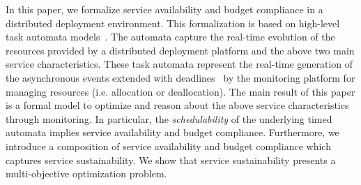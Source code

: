 In this paper, we formalize service availability and budget compliance in a distributed deployment environment.
This formalization is based on  
high-level task automata models~\cite{alur:1994:timedautomata,fersman2007task,jaghoori2010time}.
The automata capture the real-time evolution of the resources provided by a distributed deployment platform and 
the above two main service characteristics.
These  task  automata represent the  real-time generation of the asynchronous events 
extended with deadlines~\cite{bjork2013:rtabs,nobakht2013future}
by the monitoring platform for managing resources (i.e. allocation or  deallocation).
The main result of this paper is a formal model to optimize and reason about the above service  characteristics through monitoring.
In particular, the \emph{schedulability} of the underlying timed automata implies service availability and budget compliance.
Furthermore, we introduce a  composition of  service availability and  budget compliance which captures service sustainability.
We show that service sustainability presents a multi-objective optimization problem.

